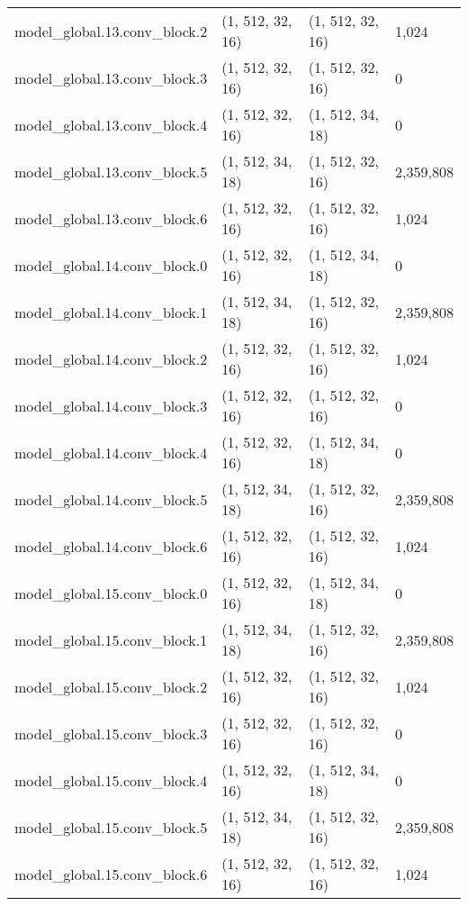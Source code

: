 \begin{longtable}{llll}
        model\_global.13.conv\_block.2 &   (1, 512, 32, 16) &   (1, 512, 32, 16) &       1,024 \\
        model\_global.13.conv\_block.3 &   (1, 512, 32, 16) &   (1, 512, 32, 16) &           0 \\
        model\_global.13.conv\_block.4 &   (1, 512, 32, 16) &   (1, 512, 34, 18) &           0 \\
        model\_global.13.conv\_block.5 &   (1, 512, 34, 18) &   (1, 512, 32, 16) &   2,359,808 \\
        model\_global.13.conv\_block.6 &   (1, 512, 32, 16) &   (1, 512, 32, 16) &       1,024 \\
        model\_global.14.conv\_block.0 &   (1, 512, 32, 16) &   (1, 512, 34, 18) &           0 \\
        model\_global.14.conv\_block.1 &   (1, 512, 34, 18) &   (1, 512, 32, 16) &   2,359,808 \\
        model\_global.14.conv\_block.2 &   (1, 512, 32, 16) &   (1, 512, 32, 16) &       1,024 \\
        model\_global.14.conv\_block.3 &   (1, 512, 32, 16) &   (1, 512, 32, 16) &           0 \\
        model\_global.14.conv\_block.4 &   (1, 512, 32, 16) &   (1, 512, 34, 18) &           0 \\
        model\_global.14.conv\_block.5 &   (1, 512, 34, 18) &   (1, 512, 32, 16) &   2,359,808 \\
        model\_global.14.conv\_block.6 &   (1, 512, 32, 16) &   (1, 512, 32, 16) &       1,024 \\
        model\_global.15.conv\_block.0 &   (1, 512, 32, 16) &   (1, 512, 34, 18) &           0 \\
        model\_global.15.conv\_block.1 &   (1, 512, 34, 18) &   (1, 512, 32, 16) &   2,359,808 \\
        model\_global.15.conv\_block.2 &   (1, 512, 32, 16) &   (1, 512, 32, 16) &       1,024 \\
        model\_global.15.conv\_block.3 &   (1, 512, 32, 16) &   (1, 512, 32, 16) &           0 \\
        model\_global.15.conv\_block.4 &   (1, 512, 32, 16) &   (1, 512, 34, 18) &           0 \\
        model\_global.15.conv\_block.5 &   (1, 512, 34, 18) &   (1, 512, 32, 16) &   2,359,808 \\
        model\_global.15.conv\_block.6 &   (1, 512, 32, 16) &   (1, 512, 32, 16) &       1,024 \\

\end{longtable}
